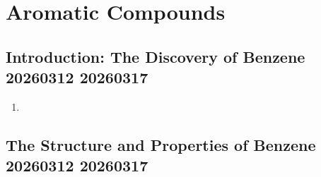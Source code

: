 \section{Aromatic Compounds}

\subsection{Introduction: The Discovery of Benzene 20260312 20260317}

\begin{enumerate}
    \item 
\end{enumerate}

\subsection{The Structure and Properties of Benzene 20260312 20260317}

